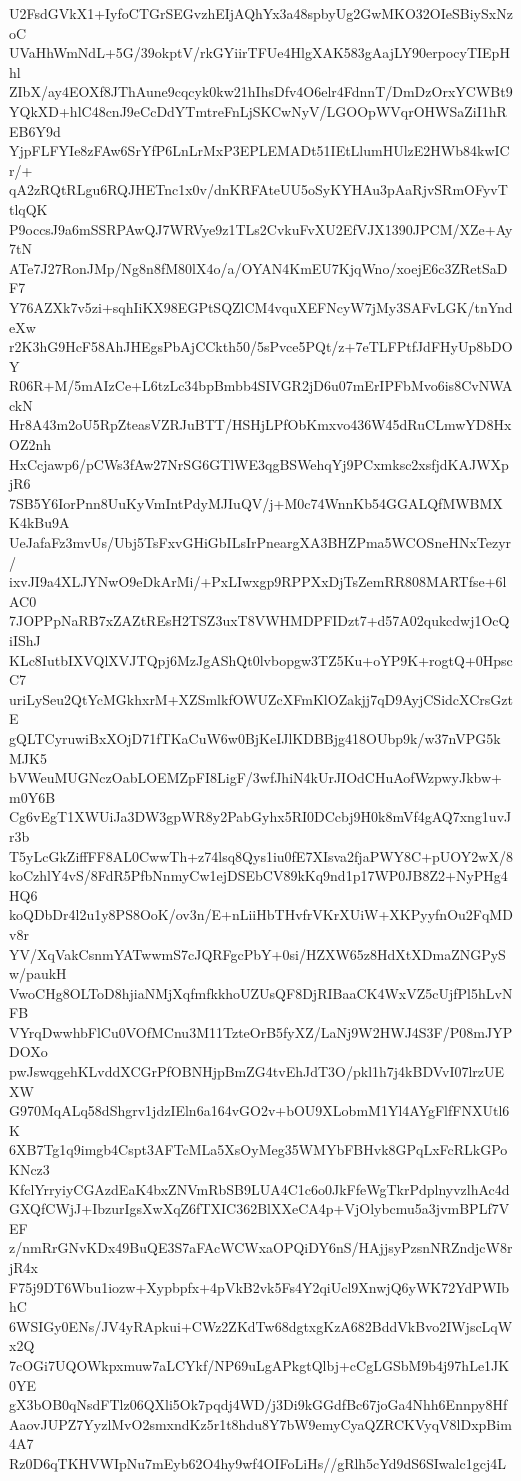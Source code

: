 U2FsdGVkX1+IyfoCTGrSEGvzhEIjAQhYx3a48spbyUg2GwMKO32OIeSBiySxNzoC
UVaHhWmNdL+5G/39okptV/rkGYiirTFUe4HlgXAK583gAajLY90erpocyTIEpHhl
ZIbX/ay4EOXf8JThAune9cqcyk0kw21hIhsDfv4O6elr4FdnnT/DmDzOrxYCWBt9
YQkXD+hlC48cnJ9eCcDdYTmtreFnLjSKCwNyV/LGOOpWVqrOHWSaZiI1hREB6Y9d
YjpFLFYIe8zFAw6SrYfP6LnLrMxP3EPLEMADt51IEtLlumHUlzE2HWb84kwICr/+
qA2zRQtRLgu6RQJHETnc1x0v/dnKRFAteUU5oSyKYHAu3pAaRjvSRmOFyvTtlqQK
P9occsJ9a6mSSRPAwQJ7WRVye9z1TLs2CvkuFvXU2EfVJX1390JPCM/XZe+Ay7tN
ATe7J27RonJMp/Ng8n8fM80lX4o/a/OYAN4KmEU7KjqWno/xoejE6c3ZRetSaDF7
Y76AZXk7v5zi+sqhIiKX98EGPtSQZlCM4vquXEFNcyW7jMy3SAFvLGK/tnYndeXw
r2K3hG9HcF58AhJHEgsPbAjCCkth50/5sPvce5PQt/z+7eTLFPtfJdFHyUp8bDOY
R06R+M/5mAIzCe+L6tzLc34bpBmbb4SIVGR2jD6u07mErIPFbMvo6is8CvNWAckN
Hr8A43m2oU5RpZteasVZRJuBTT/HSHjLPfObKmxvo436W45dRuCLmwYD8HxOZ2nh
HxCcjawp6/pCWs3fAw27NrSG6GTlWE3qgBSWehqYj9PCxmksc2xsfjdKAJWXpjR6
7SB5Y6IorPnn8UuKyVmIntPdyMJIuQV/j+M0c74WnnKb54GGALQfMWBMXK4kBu9A
UeJafaFz3mvUs/Ubj5TsFxvGHiGbILsIrPneargXA3BHZPma5WCOSneHNxTezyr/
ixvJI9a4XLJYNwO9eDkArMi/+PxLIwxgp9RPPXxDjTsZemRR808MARTfse+6lAC0
7JOPPpNaRB7xZAZtREsH2TSZ3uxT8VWHMDPFIDzt7+d57A02qukcdwj1OcQiIShJ
KLc8IutbIXVQlXVJTQpj6MzJgAShQt0lvbopgw3TZ5Ku+oYP9K+rogtQ+0HpscC7
uriLySeu2QtYcMGkhxrM+XZSmlkfOWUZcXFmKlOZakjj7qD9AyjCSidcXCrsGztE
gQLTCyruwiBxXOjD71fTKaCuW6w0BjKeIJlKDBBjg418OUbp9k/w37nVPG5kMJK5
bVWeuMUGNczOabLOEMZpFI8LigF/3wfJhiN4kUrJIOdCHuAofWzpwyJkbw+m0Y6B
Cg6vEgT1XWUiJa3DW3gpWR8y2PabGyhx5RI0DCcbj9H0k8mVf4gAQ7xng1uvJr3b
T5yLcGkZiffFF8AL0CwwTh+z74lsq8Qys1iu0fE7XIsva2fjaPWY8C+pUOY2wX/8
koCzhlY4vS/8FdR5PfbNnmyCw1ejDSEbCV89kKq9nd1p17WP0JB8Z2+NyPHg4HQ6
koQDbDr4l2u1y8PS8OoK/ov3n/E+nLiiHbTHvfrVKrXUiW+XKPyyfnOu2FqMDv8r
YV/XqVakCsnmYATwwmS7cJQRFgcPbY+0si/HZXW65z8HdXtXDmaZNGPySw/paukH
VwoCHg8OLToD8hjiaNMjXqfmfkkhoUZUsQF8DjRIBaaCK4WxVZ5cUjfPl5hLvNFB
VYrqDwwhbFlCu0VOfMCnu3M11TzteOrB5fyXZ/LaNj9W2HWJ4S3F/P08mJYPDOXo
pwJswqgehKLvddXCGrPfOBNHjpBmZG4tvEhJdT3O/pkl1h7j4kBDVvI07lrzUEXW
G970MqALq58dShgrv1jdzIEln6a164vGO2v+bOU9XLobmM1Yl4AYgFlfFNXUtl6K
6XB7Tg1q9imgb4Cspt3AFTcMLa5XsOyMeg35WMYbFBHvk8GPqLxFcRLkGPoKNcz3
KfclYrryiyCGAzdEaK4bxZNVmRbSB9LUA4C1c6o0JkFfeWgTkrPdplnyvzlhAc4d
GXQfCWjJ+IbzurIgsXwXqZ6fTXIC362BlXXeCA4p+VjOlybcmu5a3jvmBPLf7VEF
z/nmRrGNvKDx49BuQE3S7aFAcWCWxaOPQiDY6nS/HAjjsyPzsnNRZndjcW8rjR4x
F75j9DT6Wbu1iozw+Xypbpfx+4pVkB2vk5Fs4Y2qiUcl9XnwjQ6yWK72YdPWIbhC
6WSIGy0ENs/JV4yRApkui+CWz2ZKdTw68dgtxgKzA682BddVkBvo2IWjscLqWx2Q
7cOGi7UQOWkpxmuw7aLCYkf/NP69uLgAPkgtQlbj+cCgLGSbM9b4j97hLe1JK0YE
gX3bOB0qNsdFTlz06QXli5Ok7pqdj4WD/j3Di9kGGdfBc67joGa4Nhh6Ennpy8Hf
AaovJUPZ7YyzlMvO2smxndKz5r1t8hdu8Y7bW9emyCyaQZRCKVyqV8lDxpBim4A7
Rz0D6qTKHVWIpNu7mEyb62O4hy9wf4OIFoLiHs//gRlh5cYd9dS6SIwalc1gcj4L
